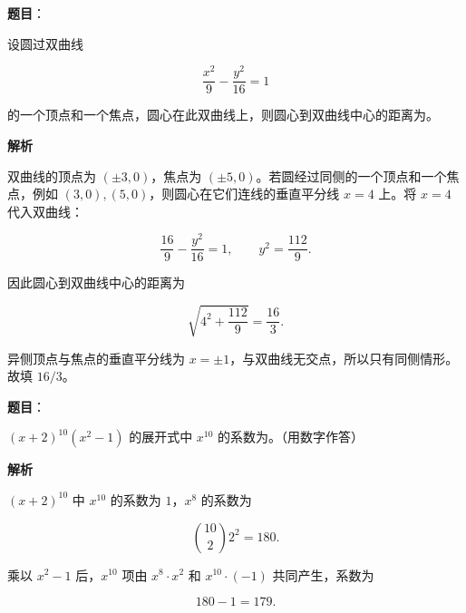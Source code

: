 \begin{answer}

\textbf{题目}：

设圆过双曲线

\nopagebreak[4]
\[
\frac{x^2}{9}-\frac{y^2}{16}=1
\]

的一个顶点和一个焦点，圆心在此双曲线上，则圆心到双曲线中心的距离为\gkblank{}。

\textbf{解析}

双曲线的顶点为 $(\pm3,0)$，焦点为 $(\pm5,0)$。若圆经过同侧的一个顶点和一个焦点，例如 $(3,0),(5,0)$，则圆心在它们连线的垂直平分线 $x=4$ 上。将 $x=4$ 代入双曲线：

\nopagebreak[4]
\[
\frac{16}{9}-\frac{y^2}{16}=1,
\qquad y^2=\frac{112}{9}.
\]

因此圆心到双曲线中心的距离为

\nopagebreak[4]
\[
\sqrt{4^2+\frac{112}{9}}=\frac{16}{3}.
\]

异侧顶点与焦点的垂直平分线为 $x=\pm1$，与双曲线无交点，所以只有同侧情形。故填 $16/3$。


\end{answer}
\begin{answer}

\textbf{题目}：

$(x+2)^{10}(x^2-1)$ 的展开式中 $x^{10}$ 的系数为\gkblank{}。（用数字作答）

\textbf{解析}

$(x+2)^{10}$ 中 $x^{10}$ 的系数为 $1$，$x^8$ 的系数为

\nopagebreak[4]
\[
\binom{10}{2}2^2=180.
\]

乘以 $x^2-1$ 后，$x^{10}$ 项由 $x^8\cdot x^2$ 和 $x^{10}\cdot(-1)$ 共同产生，系数为

\nopagebreak[4]
\[
180-1=179.
\]


\end{answer}
